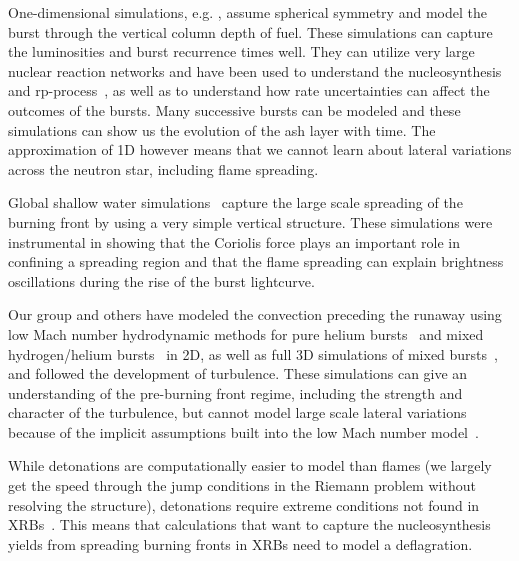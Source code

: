 \documentclass[a4paper]{jpconf}
\begin{document}
One-dimensional simulations, e.g. \cite{woosley-xrb,fisker:2008}, assume
spherical symmetry and model the burst through the vertical column
depth of fuel.  These simulations can capture the luminosities and
burst recurrence times well.  They can utilize very large nuclear
reaction networks and have been used to understand the nucleosynthesis
and rp-process~\cite{schatz:rp1999,rpprocess,schatz_rp}, as well as to understand how rate uncertainties can
affect the outcomes of the bursts.  Many successive bursts can be
modeled and these simulations can show us the evolution of the ash
layer with time.  The approximation of 1D however means that we cannot
learn about lateral variations across the neutron star, including
flame spreading.

Global shallow water simulations~\cite{SPIT_ETAL02} capture the
large scale spreading of the burning front by using a very simple
vertical structure.  These simulations were instrumental in showing
that the Coriolis force plays an important role in confining a
spreading region and that the flame spreading can explain brightness
oscillations during the rise of the burst lightcurve.

Our group and others have modeled the convection preceding the
runaway using low Mach number hydrodynamic methods for pure helium
bursts~\cite{Lin:2006,xrb} and mixed hydrogen/helium
bursts~\cite{xrb2} in 2D, as well as full 3D simulations of mixed
bursts~\cite{xrb3}, and followed the development of turbulence.
These simulations can give an understanding of the pre-burning front
regime, including the strength and character of the turbulence, but
cannot model large scale lateral variations because of the implicit
assumptions built into the low Mach number model~\cite{ABRZ:I}.

While detonations are computationally easier to model than flames (we
largely get the speed through the jump conditions in the Riemann
problem without resolving the structure), detonations require extreme
conditions not found in XRBs~\cite{ZINGALE_ETAL01,harpole:2018}.
This means that calculations that want to capture the nucleosynthesis
yields from spreading burning fronts in XRBs need to model a deflagration.
\end{document}
